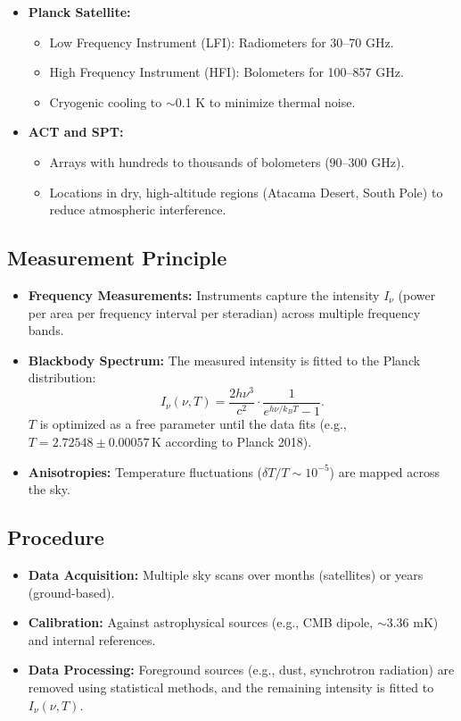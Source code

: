 \documentclass[a4paper,12pt]{article}
\theoremstyle{definition}
\theoremstyle{remark}
\begin{document}
	\begin{itemize}
		\item \textbf{Planck Satellite:}
		\begin{itemize}
			\item Low Frequency Instrument (LFI): Radiometers for 30–70 GHz.
			\item High Frequency Instrument (HFI): Bolometers for 100–857 GHz.
			\item Cryogenic cooling to $\sim$0.1 K to minimize thermal noise.
		\end{itemize}
		\item \textbf{ACT and SPT:}
		\begin{itemize}
			\item Arrays with hundreds to thousands of bolometers (90–300 GHz).
			\item Locations in dry, high-altitude regions (Atacama Desert, South Pole) to reduce atmospheric interference.
		\end{itemize}
	\end{itemize}
	
	\subsection{Measurement Principle}
	
	\begin{itemize}
		\item \textbf{Frequency Measurements:} Instruments capture the intensity $I_\nu$ (power per area per frequency interval per steradian) across multiple frequency bands.
		\item \textbf{Blackbody Spectrum:} The measured intensity is fitted to the Planck distribution:
		\[
		I_\nu(\nu, T) = \frac{2 h \nu^3}{c^2} \cdot \frac{1}{e^{h \nu / k_B T} - 1}.
		\]
		$T$ is optimized as a free parameter until the data fits (e.g., $T = 2.72548 \pm 0.00057 \, \text{K}$ according to Planck 2018).
		\item \textbf{Anisotropies:} Temperature fluctuations ($\delta T/T \sim 10^{-5}$) are mapped across the sky.
	\end{itemize}
	
	\subsection{Procedure}
	
	\begin{itemize}
		\item \textbf{Data Acquisition:} Multiple sky scans over months (satellites) or years (ground-based).
		\item \textbf{Calibration:} Against astrophysical sources (e.g., CMB dipole, $\sim$3.36 mK) and internal references.
		\item \textbf{Data Processing:} Foreground sources (e.g., dust, synchrotron radiation) are removed using statistical methods, and the remaining intensity is fitted to $I_\nu(\nu, T)$.
	\end{itemize}
	
\end{document}
